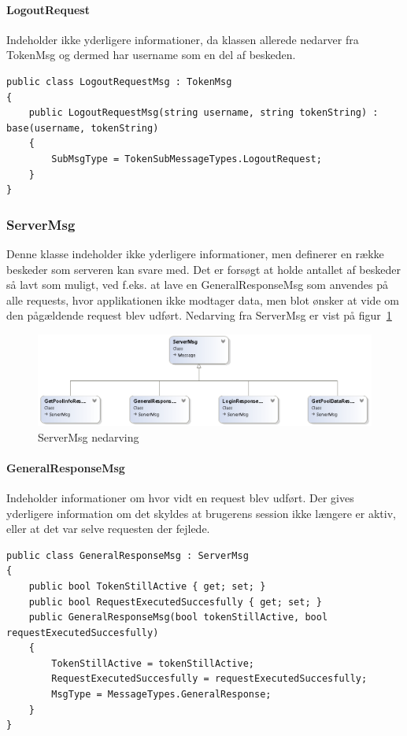 \paragraph{LogoutRequest}
Indeholder ikke yderligere informationer, da klassen allerede nedarver fra TokenMsg og dermed har username som en del af beskeden.
\begin{lstlisting}[caption=LogoutRequest, label=code:LogoutRequest]
public class LogoutRequestMsg : TokenMsg
{
	public LogoutRequestMsg(string username, string tokenString) : base(username, tokenString)
	{
		SubMsgType = TokenSubMessageTypes.LogoutRequest;
	}
}
\end{lstlisting}

\subsubsection{ServerMsg}
Denne klasse indeholder ikke yderligere informationer, men definerer en række beskeder som serveren kan svare med. Det er forsøgt at holde antallet af beskeder så lavt som muligt, ved f.eks. at lave en GeneralResponseMsg som anvendes på alle requests, hvor applikationen ikke modtager data, men blot ønsker at vide om den pågældende request blev udført. Nedarving fra ServerMsg er vist på figur~\ref{fig:ServerMsgUML}
\begin{figure}
	\centering
	\includegraphics[width=0.7\linewidth]{figs/connection/ServerMsgUML.png}
	\caption{ServerMsg nedarving}
	\label{fig:ServerMsgUML}
\end{figure}

\paragraph{GeneralResponseMsg}
Indeholder informationer om hvor vidt en request blev udført. Der gives yderligere information om det skyldes at brugerens session ikke længere er aktiv, eller at det var selve requesten der fejlede.
\begin{lstlisting}[caption=GeneralResponseMsg, label=code:GeneralResponseMsg]
public class GeneralResponseMsg : ServerMsg
{
	public bool TokenStillActive { get; set; }
	public bool RequestExecutedSuccesfully { get; set; }
	public GeneralResponseMsg(bool tokenStillActive, bool requestExecutedSuccesfully)
	{
		TokenStillActive = tokenStillActive;
		RequestExecutedSuccesfully = requestExecutedSuccesfully;
		MsgType = MessageTypes.GeneralResponse;
	}
}
\end{lstlisting}

